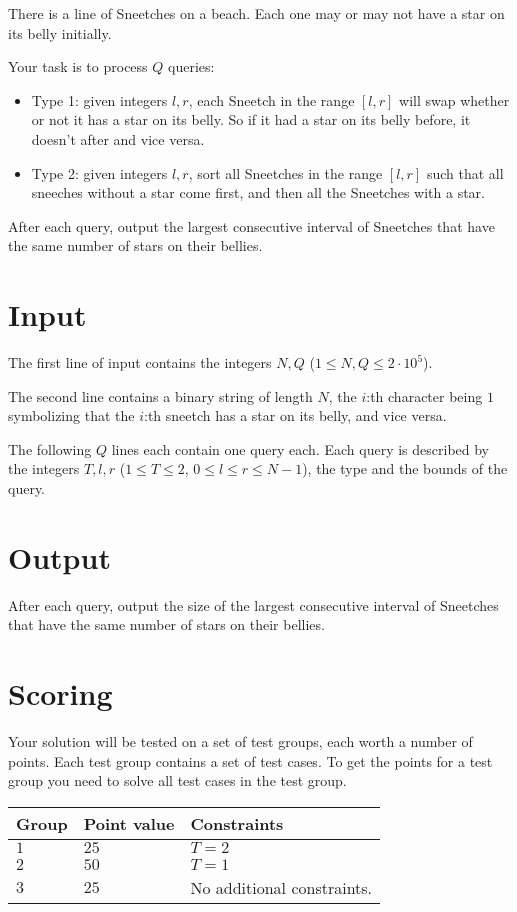 There is a line of Sneetches on a beach. Each one may or may not have a star on its belly initially.

Your task is to process $Q$ queries:

\begin{itemize}
    \item Type 1: given integers $l, r$, each Sneetch in the range $[l,r]$ will swap whether or not it has a star on its belly.
    So if it had a star on its belly before, it doesn't after and vice versa.
    \item Type 2: given integers $l, r$, sort all Sneetches in the range $[l, r]$ such that all sneeches without a star
    come first, and then all the Sneetches with a star.
\end{itemize}

After each query, output the largest consecutive interval of Sneetches that have the same number of stars on their bellies.

\section*{Input}
The first line of input contains the integers $N,Q$ ($1 \leq N,Q \leq 2 \cdot 10^5$).

The second line contains a binary string of length $N$, the $i$:th character being $1$ symbolizing that the $i$:th sneetch has
a star on its belly, and vice versa. 

The following $Q$ lines each contain one query each. Each query is described by the integers
$T, l, r$ ($1 \leq T \leq 2$, $0 \leq l \leq r \leq N - 1$), the type and the bounds of the query.

\section*{Output}
After each query, output the size of the largest consecutive interval of Sneetches that have the same number of stars on their bellies.


\section*{Scoring}
Your solution will be tested on a set of test groups, each worth a number of points.
Each test group contains a set of test cases.
To get the points for a test group you need to solve all test cases in the test group.

\noindent
\begin{tabular}{| l | l | p{12cm} |}
  \hline
  \textbf{Group} & \textbf{Point value} & \textbf{Constraints} \\ \hline
  $1$    & $25$         & $T = 2$  \\ \hline
  $2$    & $50$         & $T = 1$ \\ \hline
  $3$    & $25$         & No additional constraints. \\ \hline
\end{tabular}

